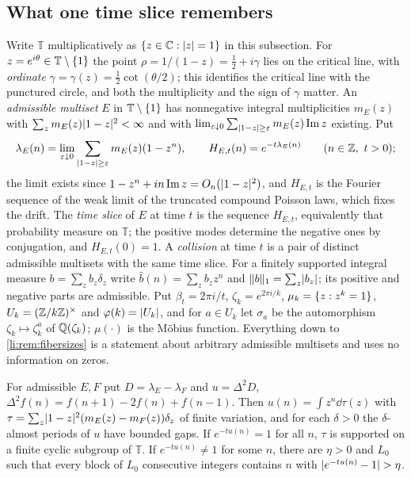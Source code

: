 \subsection{What one time slice remembers}\label{li:sec:slice}

Write $\mathbb T$ multiplicatively as $\{z\in\mathbb{C}:\lvert z\rvert=1\}$ in this subsection. For $z=e^{i\theta}\in\mathbb T\setminus\{1\}$
the point $\rho=1/(1-z)=\frac12+i\gamma$ lies on the critical line, with \emph{ordinate}
$\gamma=\gamma(z)=\frac12\cot(\theta/2)$; this identifies the critical line with the punctured circle, and both the
multiplicity and the sign of $\gamma$ matter. An \emph{admissible multiset} $E$ in $\mathbb T\setminus\{1\}$ has
nonnegative integral multiplicities $m_E(z)$ with $\sum_zm_E(z)\lvert1-z\rvert^2<\infty$ and with
$\lim_{\varepsilon\downarrow0}\sum_{\lvert1-z\rvert\ge\varepsilon}m_E(z)\operatorname{Im} z$ existing. Put
\[
 \lambda_E(n)=\lim_{\varepsilon\downarrow0}\sum_{\lvert1-z\rvert\ge\varepsilon}m_E(z)(1-z^n),\qquad H_{E,t}(n)=e^{-t\lambda_E(n)}\qquad(n\in\mathbb{Z},\ t>0);
\]
the limit exists since $1-z^n+in\operatorname{Im} z=O_n(\lvert1-z\rvert^2)$, and $H_{E,t}$ is the Fourier sequence of the weak limit of
the truncated compound Poisson laws, which fixes the drift. The \emph{time slice} of $E$ at time $t$ is the
sequence $H_{E,t}$, equivalently that probability measure on $\mathbb T$; the positive modes determine the
negative ones by conjugation, and $H_{E,t}(0)=1$. A \emph{collision} at time $t$ is a pair of distinct admissible
multisets with the same time slice. For a finitely supported integral measure $b=\sum_zb_z\delta_z$ write
$\widehat b(n)=\sum_zb_zz^n$ and $\lVert b\rVert_1=\sum_z\lvert b_z\rvert$; its positive and negative parts are admissible. Put
$\beta_t=2\pi i/t$, $\zeta_k=e^{2\pi i/k}$, $\mu_k=\{z:z^k=1\}$, $U_k=(\mathbb{Z}/k\mathbb{Z})^\times$ and $\varphi(k)=\lvert U_k\rvert$, and
for $a\in U_k$ let $\sigma_a$ be the automorphism $\zeta_k\mapsto\zeta_k^a$ of $\mathbb{Q}(\zeta_k)$; $\mu(\cdot)$ is the M\"obius
function. Everything down to \cref{li:rem:fibersizes} is a statement about arbitrary admissible multisets and
uses no information on zeros.

\begin{lemma}\label{li:lem:per}
For admissible $E,F$ put $D=\lambda_E-\lambda_F$ and $u=\Delta^2D$, $\Delta^2f(n)=f(n+1)-2f(n)+f(n-1)$. Then
$u(n)=\int z^n\dd\tau(z)$ with $\tau=\sum_z\lvert1-z\rvert^2(m_E(z)-m_F(z))\delta_z$ of finite variation, and for each $\delta>0$ the
$\delta$-almost periods of $u$ have bounded gaps. If $e^{-tu(n)}=1$ for all $n$, $\tau$ is supported on a finite cyclic
subgroup of $\mathbb T$. If $e^{-tu(n)}\ne1$ for some $n$, there are $\eta>0$ and $L_0$ such that every block of $L_0$
consecutive integers contains $n$ with $\lvert e^{-tu(n)}-1\rvert>\eta$.
\end{lemma}

